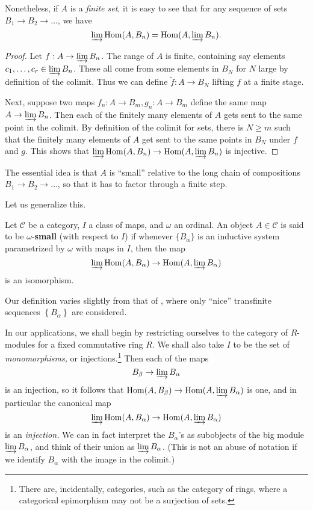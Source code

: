Nonetheless, if $A$ is a \emph{finite set}, it is easy to see that for any
sequence of sets $B_1 \to B_2 \to \dots$, we have
\[ \varinjlim \hom(A, B_n) = \hom(A, \varinjlim B_n).  \]
\begin{proof} 
Let $f: A \to \varinjlim B_n$. The range of $A$ is finite, containing say
elements $c_1, \dots, c_r \in \varinjlim B_n$. These all come from some
elements in $B_N$ for $N$ large by definition of the colimit. Thus we can
define $\widetilde{f}: A \to B_N$ lifting $f$ at a finite stage.

Next, suppose two  maps $f_n: A \to B_m,
g_n : A \to B_m$  define the same map $A \to \varinjlim B_n$.
Then each of the finitely many elements of $A$ gets sent to the same point in
the colimit. By definition of the colimit for sets, there is $N \geq m$ such
that the finitely many elements of $A$ get sent to the same points in $B_N$
under $f$ and $g$. This shows that $\varinjlim \hom(A, B_n) \to \hom(A,
\varinjlim B_n)$ is injective.
\end{proof} 


The essential idea is that $A$ is ``small'' relative to the long chain of
compositions $B_1 \to B_2 \to \dots$, so that it has to factor through a
finite step.

Let us generalize this.

\begin{definition} 
Let $\mathcal{C}$ be a category, $I $ a class of maps, and $\omega$ an ordinal.
An object $A \in \mathcal{C}$ is said to be $\omega$-\textbf{small} (with
respect to $I$) if
whenever $\{B_\alpha\}$ is an inductive system parametrized by $\omega$ with
maps in $I$, then
the map
\[ \varinjlim \hom(A, B_\alpha) \to \hom(A, \varinjlim B_\alpha)  \]
is an isomorphism. 
\end{definition} 

Our definition varies slightly from that of \cite{Ho07}, where only ``nice''
transfinite sequences $\left\{B_\alpha\right\}$ are considered.

In our applications, we shall begin by restricting ourselves to the category
of $R$-modules for a fixed commutative ring $R$.
We shall also take $I$ to be the set of \emph{monomorphisms,} or
injections.\footnote{There are, incidentally, categories, such as the category
of rings, where a categorical epimorphism may not be a surjection of sets.}
Then each of the maps
\[ B_\beta \to \varinjlim B_\alpha  \]
is an injection, so it follows that 
$\hom(A, B_\beta )\to \hom (A, \varinjlim  B_\alpha)$ is one, and in
particular the canonical map
\begin{equation} \label{homcolimmap} \varinjlim \hom(A, B_\alpha) \to \hom (A,
\varinjlim  B_\alpha)  \end{equation}
is an \emph{injection.}
We can in fact interpret the $B_\alpha$'s as subobjects of the big module
$\varinjlim B_\alpha$, and think of their union as $\varinjlim B_\alpha$.
(This is not an abuse of notation if we identify $B_\alpha$ with the image in
the colimit.)

